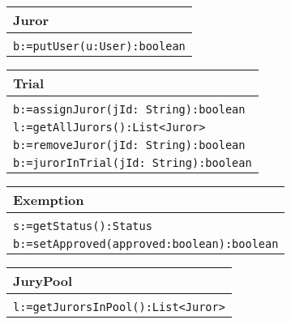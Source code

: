 \documentclass[12pt]{article}
\begin{document}
\vspace{1cm}

\begin{tabular}{| l |}
    \hline
    Juror\\
    \hline\\
    \hline
    \texttt {b:=putUser(u:User):boolean}\\
    \hline
\end{tabular}

\vspace{1cm}

\begin{tabular}{| l |}
    \hline
    Trial\\
    \hline\\
    \hline
    \texttt{b:=assignJuror(jId: String):boolean}\\
    \texttt{l:=getAllJurors():List<Juror>}\\
    \texttt{b:=removeJuror(jId: String):boolean}\\
    \texttt{b:=jurorInTrial(jId: String):boolean}\\
    \hline
\end{tabular}

\vspace{1cm}

\begin{tabular}{| l |}
    \hline
    Exemption\\
    \hline\\
    \hline
    \texttt{s:=getStatus():Status}\\
    \texttt{b:=setApproved(approved:boolean):boolean}\\
    \hline
\end{tabular}

\vspace{1cm}

\begin{tabular}{| l |}
    \hline
    JuryPool\\
    \hline\\
    \hline
    \texttt{l:=getJurorsInPool():List<Juror>}\\
    \hline
\end{tabular}
\end{document}
